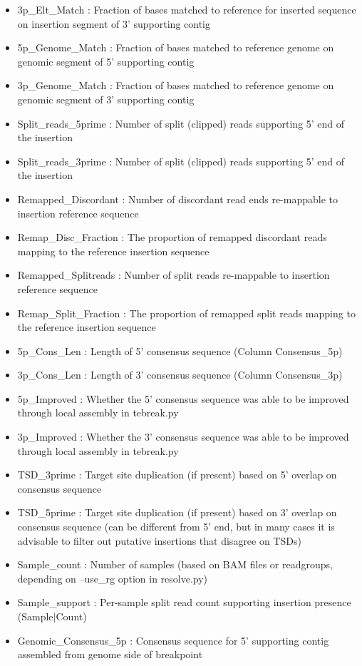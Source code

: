 \documentclass[letterpaper,11pt]{article}
\begin{document}
\begin{itemize}
\item 3p\_Elt\_Match : Fraction of bases matched to reference for inserted sequence on insertion segment of 3' supporting contig
\item 5p\_Genome\_Match : Fraction of bases matched to reference genome on genomic segment of 5' supporting contig
\item 3p\_Genome\_Match : Fraction of bases matched to reference genome on genomic segment of 3' supporting contig
\item Split\_reads\_5prime : Number of split (clipped) reads supporting 5' end of the insertion
\item Split\_reads\_3prime : Number of split (clipped) reads supporting 5' end of the insertion
\item Remapped\_Discordant : Number of discordant read ends re-mappable to insertion reference sequence
\item Remap\_Disc\_Fraction : The proportion of remapped discordant reads mapping to the reference insertion sequence
\item Remapped\_Splitreads : Number of split reads re-mappable to insertion reference sequence
\item Remap\_Split\_Fraction : The proportion of remapped split reads mapping to the reference insertion sequence
\item 5p\_Cons\_Len : Length of 5' consensus sequence (Column Consensus\_5p)
\item 3p\_Cons\_Len : Length of 3' consensus sequence (Column Consensus\_3p)
\item 5p\_Improved : Whether the 5' consensus sequence was able to be improved through local assembly in tebreak.py
\item 3p\_Improved : Whether the 3' consensus sequence was able to be improved through local assembly in tebreak.py
\item TSD\_3prime : Target site duplication (if present) based on 5' overlap on consensus sequence
\item TSD\_5prime : Target site duplication (if present) based on 3' overlap on consensus sequence (can be different from 5' end, but in many cases it is advisable to filter out putative insertions that disagree on TSDs)
\item Sample\_count : Number of samples (based on BAM files or readgroups, depending on --use\_rg option in resolve.py)
\item Sample\_support : Per-sample split read count supporting insertion presence (Sample$\vert$Count)
\item Genomic\_Consensus\_5p : Consensus sequence for 5' supporting contig assembled from genome side of breakpoint

\end{itemize}
\end{document}
